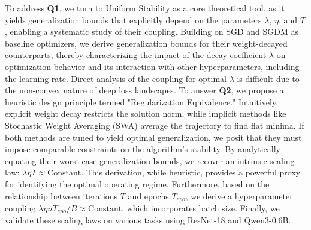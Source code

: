 To address \textbf{Q1}, we turn to Uniform Stability \cite{hardt2016train} as a core theoretical tool, as it yields generalization bounds that explicitly depend on the parameters $\lambda$, $\eta$, and $T$, enabling a systematic study of their coupling. Building on SGD and SGDM as baseline optimizers, we derive generalization bounds for their weight-decayed counterparts, thereby characterizing the impact of the decay coefficient $\lambda$ on optimization behavior and its interaction with other hyperparameters, including the learning rate.
Direct analysis of the coupling for optimal $\lambda$ is difficult due to the non-convex nature of deep loss landscapes. To answer \textbf{Q2}, we propose a heuristic design principle termed "Regularization Equivalence."
Intuitively, explicit weight decay restricts the solution norm, while implicit methods like Stochastic Weight Averaging (SWA) \cite{izmailov2018averaging} average the trajectory to find flat minima. If both methods are tuned to yield optimal generalization, we posit that they must impose comparable constraints on the algorithm's stability. By analytically equating their worst-case generalization bounds, we recover an intrinsic scaling law: $\lambda \eta T \approx \text{Constant}$. This derivation, while heuristic, provides a powerful proxy for identifying the optimal operating regime. Furthermore, based on the relationship between iterations $T$ and epochs $T_{epo}$, we derive a hyperparameter coupling $\lambda \eta nT_{epo}/B \approx \text{Constant}$, which incorporates batch size. Finally, we validate these scaling laws on various tasks using ResNet-18 and Qwen3-0.6B.

